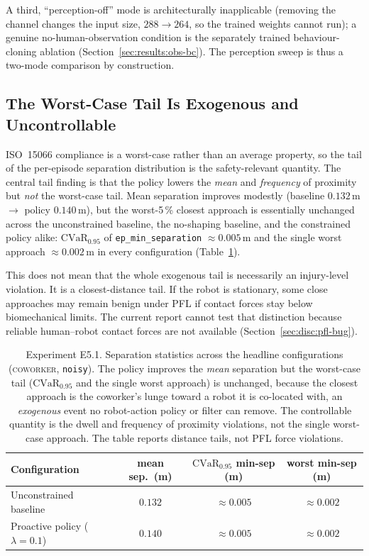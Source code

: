 \documentclass[11pt,a4paper]{report}
\newcommand{\pfl}{PFL}
\newcommand{\iso}{ISO~15066}
\newcommand{\cvar}{\ensuremath{\mathrm{CVaR}}}
\newcommand{\coworker}{\textsc{coworker}}
\begin{document}
A third, ``perception-off'' mode is architecturally inapplicable
(removing the channel changes the input size, $288 \to 264$, so the
trained weights cannot run); a genuine no-human-observation
condition is the separately trained behaviour-cloning ablation
(Section~\ref{sec:results:obs-bc}). The perception sweep is thus a
two-mode comparison by construction.

\subsection{The Worst-Case Tail Is Exogenous and Uncontrollable}
\label{sec:results:tail}

\iso{} compliance is a worst-case rather than an average property, so
the tail of the per-episode separation distribution is the
safety-relevant quantity. The central tail finding is that the policy
lowers the \emph{mean} and \emph{frequency} of proximity but
\emph{not} the worst-case tail. Mean separation improves modestly
(baseline $0.132$\,m $\rightarrow$ policy $0.140$\,m), but the
worst-5\,\% closest approach is essentially unchanged across the
unconstrained baseline, the no-shaping baseline, and the constrained
policy alike: $\cvar_{0.95}$ of \texttt{ep\_min\_separation}
$\approx 0.005$\,m and the single worst approach
$\approx 0.002$\,m in every configuration
(Table~\ref{tab:e5.1-tail}).

This does not mean that the whole exogenous tail is necessarily an
injury-level violation. It is a closest-distance tail. If the robot is
stationary, some close approaches may remain benign under \pfl{} if
contact forces stay below biomechanical limits. The current report
cannot test that distinction because reliable human--robot contact
forces are not available (Section~\ref{sec:disc:pfl-bug}).

\begin{table}[htbp]
\centering
\caption{Experiment E5.1. Separation statistics across the headline
configurations (\coworker{}, \texttt{noisy}). The policy improves the
\emph{mean} separation but the worst-case tail ($\cvar_{0.95}$ and the
single worst approach) is unchanged, because the closest approach is
the coworker's lunge toward a robot it is co-located with, an
\emph{exogenous} event no robot-action policy or filter can remove.
The controllable quantity is the dwell and frequency of proximity violations, not
the single worst-case approach. The table reports distance tails, not
\pfl{} force violations.}
\label{tab:e5.1-tail}
\small
\begin{tabular}{lccc}
\toprule
Configuration & mean sep.\ (m) & $\cvar_{0.95}$ min-sep (m) & worst min-sep (m) \\
\midrule
Unconstrained baseline             & $0.132$ & $\approx 0.005$ & $\approx 0.002$ \\
Proactive policy ($\lambda{=}0.1$) & $0.140$ & $\approx 0.005$ & $\approx 0.002$ \\
\bottomrule
\end{tabular}
\end{table}
\end{document}
